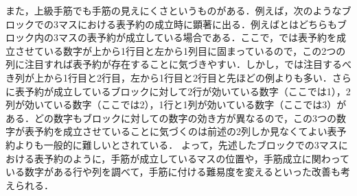 \documentclass[submit,techrep,noauthor]{ipsj}
\begin{document}
また，上級手筋でも手筋の見えにくさというものがある．例えば，次のようなブロックでの3マスにおける表予約の成立時に顕著に出る．例えばとはどちらもブロック内の3マスの表予約が成立している場合である．ここで，では表予約を成立させている数字が上から1行目と左から1列目に固まっているので，この2つの列に注目すれば表予約が存在することに気づきやすい．しかし，では注目するべき列が上から1行目と2行目，左から1行目と2行目と先ほどの例よりも多い．さらに表予約が成立しているブロックに対して2行が効いている数字（ここでは1），2列が効いている数字（ここでは2），1行と1列が効いている数字（ここでは3）がある．どの数字もブロックに対しての数字の効き方が異なるので，この3つの数字が表予約を成立させていることに気づくのは前述の2列しか見なくてよい表予約よりも一般的に難しいとされている．
よって，先述したブロックでの3マスにおける表予約のように，手筋が成立しているマスの位置や，手筋成立に関わっている数字がある行や列を調べて，手筋に付ける難易度を変えるといった改善も考えられる．
\end{document}
